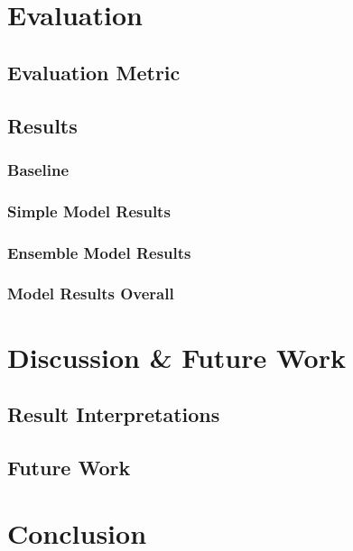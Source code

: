 \documentclass[10pt,sigconf,letterpaper,nonacm]{acmart}
\begin{document}
\section{Evaluation}

\subsection{Evaluation Metric}

\subsection{Results}

\subsubsection{Baseline}

\subsubsection{Simple Model Results}

\subsubsection{Ensemble Model Results}

\subsubsection{Model Results Overall}


\section{Discussion \& Future Work}

\subsection{Result Interpretations}

\subsection{Future Work}


\section{Conclusion}





\nocite{*}

\end{document}
